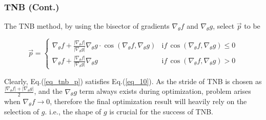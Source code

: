 \documentclass[10pt,hyperref={CJKbookmarks=true},envcountsect,mathserif]{beamer}
\begin{document}
\begin{frame}
	\frametitle{TNB (Cont.)}
	The TNB method, by using the bisector of gradients $\nabla_{\theta}f$ and $\nabla_{\theta}g$, select $\vec{p}$ to be 

\begin{equation}
\label{eq_tnb_p}
\vec{p}=\left\{\begin{array}{ll}
 \nabla_{\theta}f + \frac{|\nabla_{\theta}f|}{|\nabla_{\theta}g|} \nabla_{\theta}g \cdot \cos{(\nabla_{\theta}f,\nabla_{\theta}g)} & {\mathrm if}  \, \cos{(\nabla_{\theta}f,\nabla_{\theta}g)} \le 0\\
 \nabla_{\theta}f + \frac{|\nabla_{\theta}f|}{|\nabla_{\theta}g|} \nabla_{\theta}g &{\mathrm if}  \,
 \cos{(\nabla_{\theta}f,\nabla_{\theta}g)} > 0
\end{array}\right.
\end{equation}

Clearly, Eq.(\ref{eq_tnb_p}) satisfies Eq.(\ref{eq_10}). As the stride of TNB is chosen as $\frac{|\nabla_{\theta}f| + |\nabla_{\theta}g|}{2}$, and the $\nabla_{\theta}g$ term always exists during optimization, problem arises when $\nabla_{\theta}f\rightarrow0$, therefore the final optimization result will heavily rely on the selection of $g$. i.e., the shape of $g$ is crucial for the success of TNB.


\end{frame}
\end{document}
